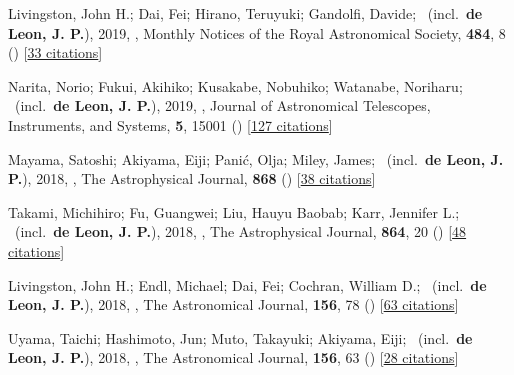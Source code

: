 \item[{\color{numcolor}\scriptsize9}] Livingston, John H.; Dai, Fei; Hirano, Teruyuki; Gandolfi, Davide; \etal\ (incl.\ \textbf{de Leon, J. P.}), 2019, , Monthly Notices of the Royal Astronomical Society, \textbf{484}, 8 () [\href{https://ui.adsabs.harvard.edu/abs/2019MNRAS.484....8L}{33 citations}]

\item[{\color{numcolor}\scriptsize8}] Narita, Norio; Fukui, Akihiko; Kusakabe, Nobuhiko; Watanabe, Noriharu; \etal\ (incl.\ \textbf{de Leon, J. P.}), 2019, , Journal of Astronomical Telescopes, Instruments, and Systems, \textbf{5}, 15001 () [\href{https://ui.adsabs.harvard.edu/abs/2019JATIS...5a5001N}{127 citations}]

\item[{\color{numcolor}\scriptsize7}] Mayama, Satoshi; Akiyama, Eiji; Pani{\'c}, Olja; Miley, James; \etal\ (incl.\ \textbf{de Leon, J. P.}), 2018, , The Astrophysical Journal, \textbf{868} () [\href{https://ui.adsabs.harvard.edu/abs/2018ApJ...868L...3M}{38 citations}]

\item[{\color{numcolor}\scriptsize6}] Takami, Michihiro; Fu, Guangwei; Liu, Hauyu Baobab; Karr, Jennifer L.; \etal\ (incl.\ \textbf{de Leon, J. P.}), 2018, , The Astrophysical Journal, \textbf{864}, 20 () [\href{https://ui.adsabs.harvard.edu/abs/2018ApJ...864...20T}{48 citations}]

\item[{\color{numcolor}\scriptsize5}] Livingston, John H.; Endl, Michael; Dai, Fei; Cochran, William D.; \etal\ (incl.\ \textbf{de Leon, J. P.}), 2018, , The Astronomical Journal, \textbf{156}, 78 () [\href{https://ui.adsabs.harvard.edu/abs/2018AJ....156...78L}{63 citations}]

\item[{\color{numcolor}\scriptsize4}] Uyama, Taichi; Hashimoto, Jun; Muto, Takayuki; Akiyama, Eiji; \etal\ (incl.\ \textbf{de Leon, J. P.}), 2018, , The Astronomical Journal, \textbf{156}, 63 () [\href{https://ui.adsabs.harvard.edu/abs/2018AJ....156...63U}{28 citations}]

